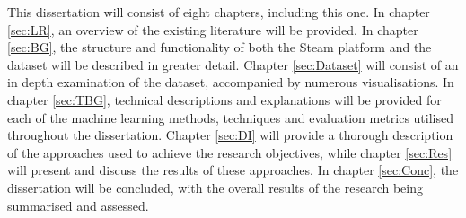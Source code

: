 This dissertation will consist of eight chapters, including this one. In chapter \ref{sec:LR}, an overview of the existing literature will be provided. In chapter \ref{sec:BG}, the structure and functionality of both the Steam platform and the dataset will be described in greater detail. Chapter \ref{sec:Dataset} will consist of an in depth examination of the dataset, accompanied by numerous visualisations. In chapter \ref{sec:TBG}, technical descriptions and explanations will be provided for each of the machine learning methods, techniques and evaluation metrics utilised throughout the dissertation. Chapter \ref{sec:DI} will provide a thorough description of the approaches used to achieve the research objectives, while chapter \ref{sec:Res} will present and discuss the results of these approaches. In chapter \ref{sec:Conc}, the dissertation will be concluded, with the overall results of the research being summarised and assessed.
